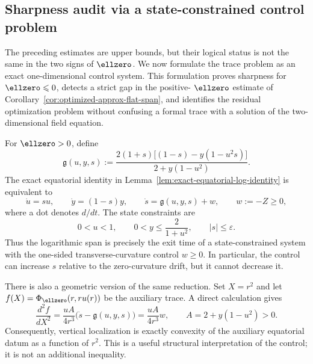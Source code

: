 \subsection{Sharpness audit via a state-constrained control problem}
\label{subsec:approx-flat-sharpness}

The preceding estimates are upper bounds, but their logical status is not
the same in the two signs of $\ellzero$. We now formulate the trace problem
as an exact one-dimensional control system. This formulation proves
sharpness for $\ellzero\leqslant0$, detects a strict gap in the positive-
$\ellzero$ estimate of Corollary~\ref{cor:optimized-approx-flat-span}, and
identifies the residual optimization problem without confusing a formal
trace with a solution of the two-dimensional field equation.

For $\ellzero>0$, define
\begin{equation}
\mathfrak g(u,y,s):=
\frac{2(1+s)\bigl[(1-s)-y(1-u^2s)\bigr]}
{2+y(1-u^2)}.
\label{eq:positive-l-control-drift}
\end{equation}
The exact equatorial identity in
Lemma~\ref{lem:exact-equatorial-log-identity} is equivalent to
\begin{equation}
\dot u=su,\qquad
\dot y=(1-s)y,\qquad
\dot s=\mathfrak g(u,y,s)+w,
\qquad w:=-Z\geqslant0,
\label{eq:positive-l-control-system}
\end{equation}
where a dot denotes $d/dt$. The state constraints are
\begin{equation}
0<u<1,\qquad
0<y\leqslant\frac{2}{1+u^2},\qquad
|s|\leqslant\varepsilon.
\label{eq:positive-l-control-state}
\end{equation}
Thus the logarithmic span is precisely the exit time of a
state-constrained system with the one-sided transverse-curvature control
$w\geqslant0$. In particular, the control can increase $s$ relative to the
zero-curvature drift, but it cannot decrease it.

There is also a geometric version of the same reduction. Set
$X=r^2$ and let
$f(X)=\Phi_{\ellzero}(r,ru(r))$ be the auxiliary trace. A direct
calculation gives
\begin{equation}
\frac{d^2f}{dX^2}
=\frac{uA}{4r^3}\bigl(\dot s-\mathfrak g(u,y,s)\bigr)
=\frac{uA}{4r^3}w,
\qquad A=2+y(1-u^2)>0.
\label{eq:control-convexity-equivalence}
\end{equation}
Consequently, vertical localization is exactly convexity of the auxiliary
equatorial datum as a function of $r^2$. This is a useful structural
interpretation of the control; it is not an additional inequality.

